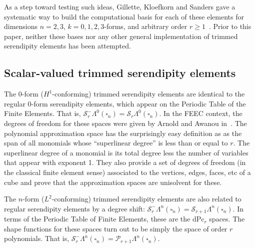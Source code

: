 \documentclass[manuscript,screen]{acmart}
\newcommand{\calP}{\mathcal{P}}
\newcommand{\calS}{\mathcal{S}}
\begin{document}
  
    
	As a step toward testing such ideas, Gillette, Kloefkorn and Sanders gave a systematic way to build the computational basis for each of these elements for dimensions $n = 2, 3$, $k=0, 1, 2, 3$-forms, and arbitrary order $r \geq 1$~\cite{gillette2019computational}.
	Prior to this paper, neither these bases nor any other general implementation of trimmed serendipity elements has been attempted.
  
  

  \subsection{Scalar-valued trimmed serendipity elements}
  The 0-form ($H^1$-conforming) trimmed serendipity elements are identical to the regular 0-form serendipity elements, which appear on the Periodic Table of the Finite Elements.  That is, $\calS_r^-\Lambda^0(\square_n) = \calS_r\Lambda^0(\square_n)$.  
  In the FEEC context, the degrees of freedom for these spaces were given by Arnold and Awanou in~\cite{arnold2011serendipity}.
  The polynomial approximation space has the surprisingly easy definition as as the span of all monomials whose ``superlinear degree'' is less than or equal to $r$. 
  The superlinear degree of a monomial is its total degree less the number of variables that appear with exponent 1.
  They also provide a set of degrees of freedom (in the classical finite element sense) associated to the vertices, edges, faces, etc of a cube and prove that the approximation spaces are unisolvent for these.
  
  The $n$-form ($L^2$-conforming) trimmed serendipity elements are also related to regular serendipity elements by a degree shift: $\calS_r^-\Lambda^n(\square_n) = \calS_{r+1}\Lambda^n(\square_n)$.  In terms of the Periodic Table of Finite Elements, these are the dPc$_r$ spaces.  The shape functions for these spaces turn out to be simply the space of order $r$ polynomials.  That is, $\calS_r^-\Lambda^n(\square_n) = \calP_{r+1}\Lambda^n(\square_n)$.
\end{document}
